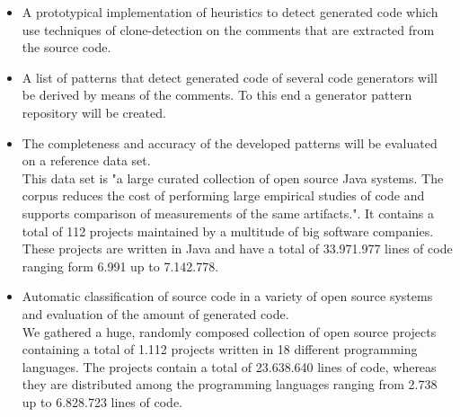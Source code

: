 \begin{itemize}
	\item A prototypical implementation of heuristics to detect generated code which use techniques of clone-detection on the comments that are extracted from the source code.
	\item A list of patterns that detect generated code of several code generators will be derived by means of the comments. To this end a generator pattern repository will be created.
	\item The completeness and accuracy of the developed patterns will be evaluated on a reference data set.\\
	This data set is "a large curated collection of open source Java systems. The corpus reduces the cost of performing
	large empirical studies of code and supports comparison of measurements of the same artifacts."\cite[p.~1]{TemperoEwanandAnslowCraigandDietrichJensandHanTedandLiJingandLumpeMarkusandMeltonHaydenandNoble2010a}. It contains a total of 112 projects maintained by a multitude of big software companies. These projects are written in Java and have a total of 33.971.977 lines of code ranging form 6.991 up to 7.142.778.
	\item Automatic classification of source code in a variety of open source systems and evaluation of the amount of generated code.\\
	We gathered a huge, randomly composed collection of open source projects containing a total of 1.112 projects written in 18 different programming languages. The projects contain a total of 23.638.640 lines of code, whereas they are distributed among the programming languages ranging from 2.738 up to 6.828.723 lines of code. 
\end{itemize}